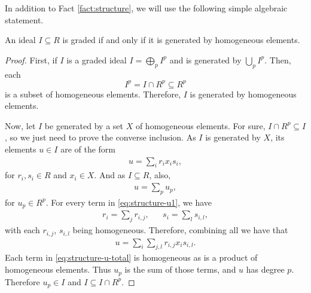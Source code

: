 In addition to Fact \ref{fact:structure}, we will use the following simple algebraic statement.
\begin{proposition} \label{prop:graded-iff-homo}
    An ideal $ I \subseteq R $ is graded if and only if it is generated by homogeneous elements.
\end{proposition}
\begin{proof}
    First, if $ I $ is a graded ideal $ I = \bigoplus_p I^p $ and is generated by $ \bigcup_p I^p $. Then, each
    $$
        I^p = I \cap R^p \subseteq R^p 
    $$
    is a subset of homogeneous elements. Therefore, $ I $ is generated by homogeneous elements.
    
    Now, let $ I $ be generated by a set $ X $ of homogeneous elements. For sure, $ I \cap R^p \subseteq I $, so we just need to prove the converse inclusion. As $ I $ is generated by $ X $, its elements $ u \in I $ are of the form
    \begin{align}
        u = \sum_i r_i x_i s_i, \label{eq:structure-u1}
    \end{align}
    for $ r_i, s_i \in R $ and $ x_i \in X $. And as $ I \subseteq R $, also,
    \begin{align}
        u = \sum_p u_p,
    \end{align}
    for $ u_p \in R^p $. For every term in \eqref{eq:structure-u1}, we have
    \begin{align}
        r_i = \sum_j r_{i,j}, &  & s_i = \sum_l s_{i,l}, 
    \end{align}
    with each $ r_{i,j} $, $ s_{i,l} $ being homogeneous. Therefore, combining all we have that
    \begin{align}
        u = \sum_i \sum_{j, l} r_{i, j} x_i s_{i, l}. \label{eq:structure-u-total}
    \end{align}
    Each term in \eqref{eq:structure-u-total} is homogeneous as is a product of homogeneous elements. Thus $ u_p $ is the sum of those terms, and $ u $ has degree $ p $. Therefore $ u_p \in I $ and $ I \subseteq I \cap R^p $.
\end{proof}

